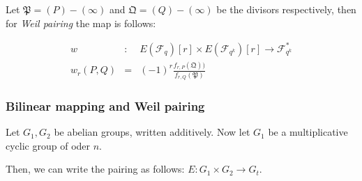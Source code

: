 









Let  $\mathfrak{P} = (P) - (\infty)$ and $\mathfrak{Q} = (Q) - (\infty)$
be the divisors respectively, then for \textit{ Weil pairing}
the map is follows\cite{ecc.fam.param}:

\[
    \begin{matrix}
        w & : & E(\mathcal{F}_q)[r]  \times E(\mathcal{F}_{q^k})[r] \rightarrow \mathcal{F}^{*}_{q^k}  \\
        w_r(P, Q) & = & (-1)^r \frac{f_{r,P}(\mathfrak{Q}))}{f_{r,Q}(\mathfrak{P})}
    \end{matrix}

\]










\subsubsection{Bilinear mapping and Weil pairing}


Let $G_1, G_2$ be abelian groups, written additively.
Now let $G_1$ be a multiplicative cyclic group of oder $n$.

Then, we can write the pairing as follows: $E: G_1 \times G_2 \rightarrow G_t$.


